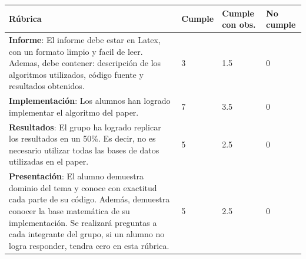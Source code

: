 \documentclass{article}
\begin{document}
\begin{table}[hbt!]
	\begin{tabular}{|p{8cm}|x{2.5cm}|x{3cm}|x{2.5cm}|}
		\hline 
		\textbf{Rúbrica} & \textbf{Cumple}  & \textbf{Cumple con obs.}  & \textbf{No cumple} \\
		\hline 
		\textbf{Informe}: El informe debe estar en Latex, con un formato limpio y facil de leer. Ademas, debe contener: descripción de los algoritmos utilizados, código fuente y resultados obtenidos.   & 3 & 1.5 & 0   \\ 
		\hline 
		
		\textbf{Implementación}: Los alumnos han logrado implementar el algoritmo del paper.  & 7 & 3.5 & 0   \\ \hline
		
		\textbf{Resultados}: El grupo ha logrado replicar los resultados en un 50\%. Es decir, no es necesario utilizar todas las bases de datos utilizadas en el paper.  & 5 & 2.5 & 0   \\
		\hline 
		
		\textbf{Presentación}: El alumno demuestra dominio del tema y conoce con exactitud cada parte de su código. Además, demuestra conocer la base matemática de su implementación. Se realizará preguntas a cada integrante del grupo, si un alumno no logra responder, tendra cero en esta rúbrica. & 5 & 2.5 & 0   \\
		\hline 
		
	\end{tabular}
\end{table}


\clearpage


\end{document}
